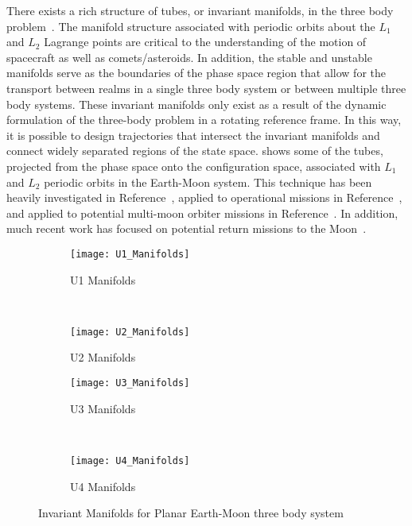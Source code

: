 \documentclass[letterpaper, preprint, paper,11pt]{AAS}	%
\begin{document}
There exists a rich structure of tubes, or invariant manifolds, in the three body problem~\cite{koon2000,conley1968}.
The manifold structure associated with periodic orbits about the \( L_1 \) and \( L_2 \) Lagrange points are critical to the understanding of the motion of spacecraft as well as comets/asteroids.
In addition, the stable and unstable manifolds serve as the boundaries of the phase space region that allow for the transport between realms in a single three body system or between multiple three body systems.
These invariant manifolds only exist as a result of the dynamic formulation of the three-body problem in a rotating reference frame. 
In this way, it is possible to design trajectories that intersect the invariant manifolds and connect widely separated regions of the state space. 
 shows some of the tubes, projected from the phase space onto the configuration space, associated with \( L_1 \) and \( L_2 \) periodic orbits in the Earth-Moon system. 
This technique has been heavily investigated in Reference~, applied to operational missions in Reference~, and applied to potential multi-moon orbiter missions in Reference~.
In addition, much recent work has focused on potential return missions to the Moon~\cite{zanzottera2012,campagnola2012,mingotti2011,ozimek2010a,mingotti2009}.
\begin{figure}
     \centering
        \begin{subfigure}[b]{0.3\textwidth}
                \texttt{[image: U1\_Manifolds]}
                \caption{U1 Manifolds}
                \label{fig:u1_manifolds}
        \end{subfigure}%
        ~%
        \begin{subfigure}[b]{0.3\textwidth}
                \texttt{[image: U2\_Manifolds]}
                \caption{U2 Manifolds}
                \label{fig:u2_manifolds}
        \end{subfigure}
        
        \begin{subfigure}[b]{0.3\textwidth}
                \texttt{[image: U3\_Manifolds]}
                \caption{U3 Manifolds}
                \label{fig:u3_manifolds}
        \end{subfigure}%
        ~%
        \begin{subfigure}[b]{0.3\textwidth}
                \texttt{[image: U4\_Manifolds]}
                \caption{U4 Manifolds}
                \label{fig:u4_manifolds}
        \end{subfigure}
        \caption{Invariant Manifolds for Planar Earth-Moon three body system}
	\label{fig:invariant_manifolds}
\end{figure}
\end{document}
